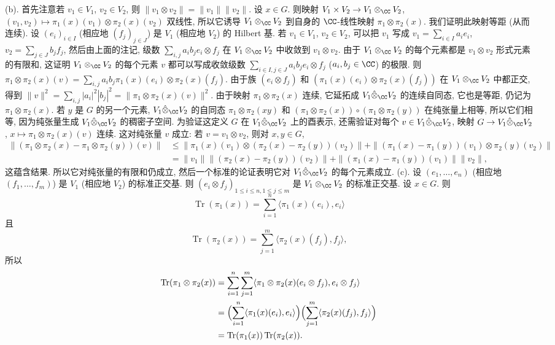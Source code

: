 \begin{solution}
(b). 首先注意若 $v_1 \in V_1$, $v_2 \in V_2$, 则 $\|v_1 \otimes v_2\| = \|v_1\|\|v_2\|$.
设 $x \in G$. 则映射 $V_1 \times V_2 \to V_1 \otimes_{\CC}V_2$, $(v_1, v_2) \longmapsto \pi_1(x)(v_1) \otimes \pi_2(x)(v_2)$ 双线性, 所以它诱导 $V_1 \otimes_{\CC}V_2$ 到自身的 $\CC$-线性映射 $\pi_1 \otimes \pi_2(x)$. 我们证明此映射等距 (从而连续). 设 $(e_i)_{i \in I}$ (相应地 $(f_j)_{j \in J}$) 是 $V_1$ (相应地 $V_2$) 的 Hilbert 基. 若 $v_1 \in V_1$, $v_2 \in V_2$, 可以把 $v_1$ 写成 $v_1 = \sum_{i \in I}a_ie_i$, $v_2 = \sum_{j \in J}b_jf_j$, 然后由上面的注记, 级数 $\sum_{i,j}a_ib_j e_i \otimes f_j$ 在 $V_1 \otimes_{\CC}V_2$ 中收敛到 $v_1 \otimes v_2$. 由于 $V_1 \otimes_{\CC}V_2$ 的每个元素都是 $v_1 \otimes v_2$ 形式元素的有限和, 这证明 $V_1 \otimes_{\CC}V_2$ 的每个元素 $v$ 都可以写成收敛级数 $\sum_{i \in I, j \in J}a_ib_je_i \otimes f_j$ ($a_i, b_j \in \CC$) 的极限. 则 $\pi_1 \otimes \pi_2(x)(v) = \sum_{i,j}a_ib_j\pi_1(x)(e_i) \otimes \pi_2(x)(f_j)$. 由于族 $(e_i \otimes f_j)$ 和 $(\pi_1(x)(e_i) \otimes \pi_2(x)(f_j))$ 在 $V_1 \otimes_{\CC}V_2$ 中都正交, 得到 $\|v\|^2 = \sum_{i,j}|a_i|^2|b_j|^2 = \|\pi_1 \otimes \pi_2(x)(v)\|^2$.
由于映射 $\pi_1 \otimes \pi_2(x)$ 连续, 它延拓成 $V_1 \hat{\otimes}_{\CC}V_2$ 的连续自同态, 它也是等距, 仍记为 $\pi_1 \otimes \pi_2(x)$.
若 $y$ 是 $G$ 的另一个元素, $V_1 \hat{\otimes}_{\CC}V_2$ 的自同态 $\pi_1 \otimes \pi_2(xy)$ 和 $(\pi_1 \otimes \pi_2(x)) \circ (\pi_1 \otimes \pi_2(y))$ 在纯张量上相等, 所以它们相等, 因为纯张量生成 $V_1 \hat{\otimes}_{\CC}V_2$ 的稠密子空间.
为验证这定义 $G$ 在 $V_1 \hat{\otimes}_{\CC}V_2$ 上的酉表示, 还需验证对每个 $v \in V_1 \hat{\otimes}_{\CC}V_2$, 映射 $G \to V_1 \hat{\otimes}_{\CC}V_2$, $x \longmapsto \pi_1 \otimes \pi_2(x)(v)$ 连续. 这对纯张量 $v$ 成立: 若 $v = v_1 \otimes v_2$, 则对 $x, y \in G$,
\begin{align*}
\|(\pi_1 \otimes \pi_2(x) - \pi_1 \otimes \pi_2(y))(v)\| &\leq \|\pi_1(x)(v_1) \otimes (\pi_2(x) - \pi_2(y))(v_2)\| + \|(\pi_1(x) - \pi_1(y))(v_1) \otimes \pi_2(y)(v_2)\| \\
&= \|v_1\|\|(\pi_2(x) - \pi_2(y))(v_2)\| + \|(\pi_1(x) - \pi_1(y))(v_1)\|\|v_2\|,
\end{align*}
这蕴含结果. 所以它对纯张量的有限和仍成立, 然后一个标准的论证表明它对 $V_1 \hat{\otimes}_{\CC}V_2$ 的每个元素成立.
(c). 设 $(e_1, \ldots, e_n)$ (相应地 $(f_1, \ldots, f_m)$) 是 $V_1$ (相应地 $V_2$) 的标准正交基. 则 $(e_i \otimes f_j)_{1 \leq i \leq n, 1 \leq j \leq m}$ 是 $V_1 \otimes_{\CC}V_2$ 的标准正交基. 设 $x \in G$. 则
\[
\operatorname{Tr}(\pi_1(x)) = \sum_{i=1}^n\langle \pi_1(x)(e_i), e_i \rangle
\]
且
\[
\operatorname{Tr}(\pi_2(x)) = \sum_{j=1}^m\langle \pi_2(x)(f_j), f_j \rangle,
\]
所以
\begin{align*}
\operatorname{Tr}(\pi_1 \otimes \pi_2(x)) &= \sum_{i=1}^n\sum_{j=1}^m\langle \pi_1 \otimes \pi_2(x)(e_i \otimes f_j), e_i \otimes f_j \rangle \\
&= \Bigl(\sum_{i=1}^n\langle \pi_1(x)(e_i), e_i \rangle\Bigr)\Bigl(\sum_{j=1}^m\langle \pi_2(x)(f_j), f_j \rangle\Bigr) \\
&= \operatorname{Tr}(\pi_1(x))\operatorname{Tr}(\pi_2(x)).
\end{align*}
\end{solution}

